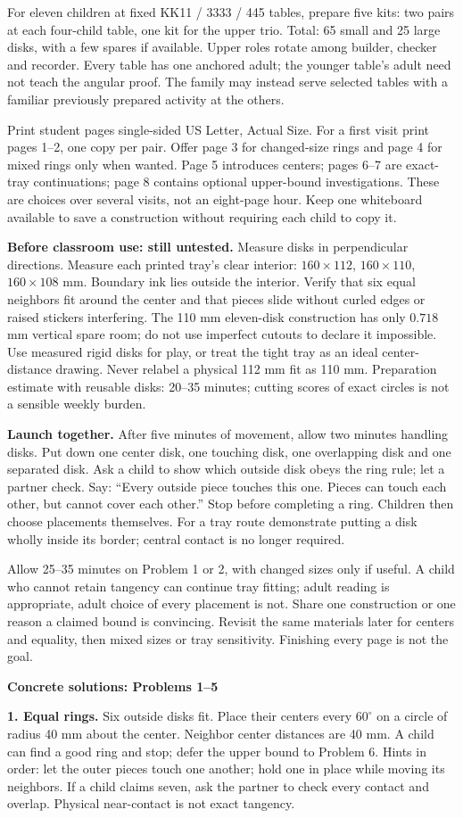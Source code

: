 \documentclass[11pt]{article}
\newcommand{\heading}[1]{\par\textbf{#1}\par}
\begin{document}
For eleven children at fixed KK11 / 3333 / 445 tables, prepare five kits: two pairs at each four-child table, one kit for the upper trio. Total: 65 small and 25 large disks, with a few spares if available. Upper roles rotate among builder, checker and recorder. Every table has one anchored adult; the younger table's adult need not teach the angular proof. The family may instead serve selected tables with a familiar previously prepared activity at the others.

Print student pages single-sided US Letter, Actual Size. For a first visit print pages 1--2, one copy per pair. Offer page 3 for changed-size rings and page 4 for mixed rings only when wanted. Page 5 introduces centers; pages 6--7 are exact-tray continuations; page 8 contains optional upper-bound investigations. These are choices over several visits, not an eight-page hour. Keep one whiteboard available to save a construction without requiring each child to copy it.

\textbf{Before classroom use: still untested.} Measure disks in perpendicular directions. Measure each printed tray's clear interior: $160\times 112$, $160\times 110$, $160\times 108$ mm. Boundary ink lies outside the interior. Verify that six equal neighbors fit around the center and that pieces slide without curled edges or raised stickers interfering. The 110 mm eleven-disk construction has only $0.718$ mm vertical spare room; do not use imperfect cutouts to declare it impossible. Use measured rigid disks for play, or treat the tight tray as an ideal center-distance drawing. Never relabel a physical 112 mm fit as 110 mm. Preparation estimate with reusable disks: 20--35 minutes; cutting scores of exact circles is not a sensible weekly burden.

\textbf{Launch together.} After five minutes of movement, allow two minutes handling disks. Put down one center disk, one touching disk, one overlapping disk and one separated disk. Ask a child to show which outside disk obeys the ring rule; let a partner check. Say: ``Every outside piece touches this one. Pieces can touch each other, but cannot cover each other.'' Stop before completing a ring. Children then choose placements themselves. For a tray route demonstrate putting a disk wholly inside its border; central contact is no longer required.

Allow 25--35 minutes on Problem 1 or 2, with changed sizes only if useful. A child who cannot retain tangency can continue tray fitting; adult reading is appropriate, adult choice of every placement is not. Share one construction or one reason a claimed bound is convincing. Revisit the same materials later for centers and equality, then mixed sizes or tray sensitivity. Finishing every page is not the goal.
\newpage
\heading{Concrete solutions: Problems 1--5}
\textbf{1. Equal rings.} Six outside disks fit. Place their centers every $60^\circ$ on a circle of radius 40 mm about the center. Neighbor center distances are 40 mm. A child can find a good ring and stop; defer the upper bound to Problem 6. Hints in order: let the outer pieces touch one another; hold one in place while moving its neighbors. If a child claims seven, ask the partner to check every contact and overlap. Physical near-contact is not exact tangency.
\end{document}
